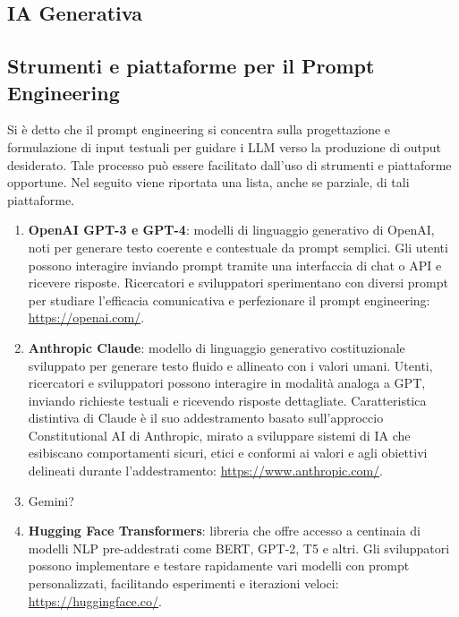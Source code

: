    \subsection{IA Generativa}

    \subsection{Strumenti e piattaforme per il Prompt Engineering}
        Si è detto che il prompt engineering si concentra sulla progettazione e formulazione di input testuali per guidare i LLM verso la produzione di output desiderato. Tale processo può essere facilitato dall'uso di strumenti e piattaforme opportune. Nel seguito viene riportata una lista, anche se parziale, di tali piattaforme.

        \begin{enumerate}
            \item \textbf{OpenAI GPT-3 e GPT-4}: modelli di linguaggio generativo di OpenAI, noti per generare testo coerente e contestuale da prompt semplici. Gli utenti possono interagire inviando prompt tramite una interfaccia di chat o API e ricevere risposte. Ricercatori e sviluppatori sperimentano con diversi prompt per studiare l'efficacia comunicativa e perfezionare il prompt engineering: \url{https://openai.com/}.

            \item \textbf{Anthropic Claude}: modello di linguaggio generativo costituzionale sviluppato per generare testo fluido e allineato con i valori umani. Utenti, ricercatori e sviluppatori possono interagire in modalità analoga a GPT, inviando richieste testuali e ricevendo risposte dettagliate. Caratteristica distintiva di Claude è il suo addestramento basato sull'approccio Constitutional AI di Anthropic, mirato a sviluppare sistemi di IA che esibiscano comportamenti sicuri, etici e conformi ai valori e agli obiettivi delineati durante l'addestramento: \url{https://www.anthropic.com/}.

            \item Gemini?

            \item \textbf{Hugging Face Transformers}: libreria che offre accesso a centinaia di modelli NLP pre-addestrati come BERT, GPT-2, T5 e altri. Gli sviluppatori possono implementare e testare rapidamente vari modelli con prompt personalizzati, facilitando esperimenti e iterazioni veloci: \url{https://huggingface.co/}.


\end{enumerate}
